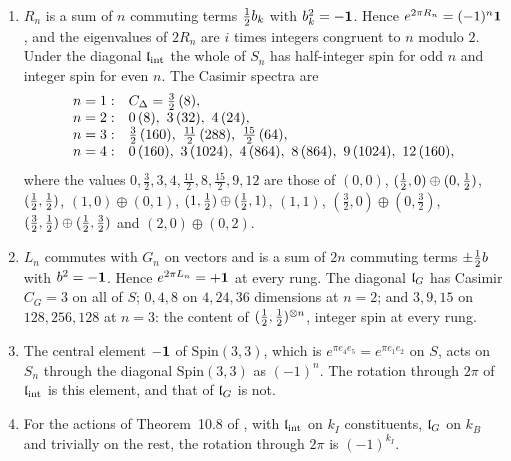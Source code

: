 \begin{proposition}
\label{e3:prop:spin}
\begin{enumerate}[label=(\roman*),leftmargin=2.2em]
\item $R_n$ is a sum of $n$ commuting terms $\tfrac12 b_k$ with $b_k^2=-\mathbf 1$. Hence $e^{2\pi R_n}=(-1)^n\mathbf 1$, and the eigenvalues of $2R_n$ are $i$ times
integers congruent to $n$ modulo $2$. Under the diagonal $\mathfrak l_{\rm int}$ the whole of $S_n$ has half-integer spin for odd $n$ and integer spin for even
$n$. The Casimir spectra are
\[
\begin{array}{@{}ll@{}}
n=1: & C_\Delta=\tfrac32\,(8),\\
n=2: & 0\,(8),\ 3\,(32),\ 4\,(24),\\
n=3: & \tfrac32\,(160),\ \tfrac{11}2\,(288),\ \tfrac{15}2\,(64),\\
n=4: & 0\,(160),\ 3\,(1024),\ 4\,(864),\ 8\,(864),\ 9\,(1024),\ 12\,(160),
\end{array}
\]
where the values $0,\tfrac32,3,4,\tfrac{11}2,8,\tfrac{15}2,9,12$ are those of $(0,0)$, $(\tfrac12,0)\oplus(0,\tfrac12)$, $(\tfrac12,\tfrac12)$, $(1,0)\oplus(0,1)$, $(1,\tfrac12)\oplus(\tfrac12,1)$, $(1,1)$, $(\tfrac32,0)\oplus(0,\tfrac32)$,
$(\tfrac32,\tfrac12)\oplus(\tfrac12,\tfrac32)$ and $(2,0)\oplus(0,2)$.
\item $L_n$ commutes with $G_n$ on vectors and is a sum of $2n$ commuting terms $\pm\tfrac12 b$ with $b^2=-\mathbf 1$. Hence $e^{2\pi L_n}=+\mathbf 1$ at every rung. The
diagonal $\mathfrak l_G$ has Casimir $C_G=3$ on all of $S$; $0,4,8$ on $4,24,36$ dimensions at $n=2$; and $3,9,15$ on $128,256,128$ at $n=3$: the content of
$(\tfrac12,\tfrac12)^{\otimes n}$, integer spin at every rung.
\item The central element $-\mathbf 1$ of $\mathrm{Spin}(3,3)$, which is $e^{\pi e_4e_5}=e^{\pi e_1e_2}$ on $S$, acts on $S_n$ through the diagonal
$\mathrm{Spin}(3,3)$ as $(-1)^n$. The rotation through $2\pi$ of $\mathfrak l_{\rm int}$ is this element, and that of $\mathfrak l_G$ is not.
\item For the actions of Theorem~10.8 of \cite{ES17}, with $\mathfrak l_{\rm int}$ on $k_I$ constituents, $\mathfrak l_G$ on $k_B$ and trivially on the rest, the rotation
through $2\pi$ is $(-1)^{k_I}$.
\end{enumerate}
\end{proposition}

